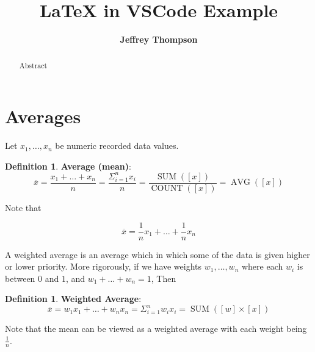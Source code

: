 \documentclass[a4paper]{article}
\theoremstyle{plain} %
\theoremstyle{definition} %
\newtheorem{definition}[theorem]{Definition}
\numberwithin{equation}{subsection}
\begin{document}

\title{\textbf{LaTeX in VSCode Example}}




\author{\textbf{Jeffrey Thompson}}
\maketitle
\begin{abstract}
Abstract
\end{abstract}
\tableofcontents
\newpage
\section{Averages}
Let $x_1,\dots, x_n$ be numeric recorded data values.

\begin{definition}
\textbf{Average (mean)}:
$$\overline{x} = \frac{x_1 + \dots + x_n}{n}= \frac{\Sigma_{i=1}^nx_i}{n}= \frac{\operatorname{SUM}([x])}{\operatorname{COUNT}([x])} = \operatorname{AVG}([x])$$
\end{definition}

Note that 

$$\overline{x}= \frac{1}{n}x_1 + \dots + \frac{1}{n}x_n$$

A weighted average is an average which in which some of the data is given higher or lower priority. More rigorously, if we have weights $w_1, \dots, w_n$ where each $w_i$ is between $0$ and $1$, and $w_1 + \dots + w_n = 1$, Then

\begin{definition}
\textbf{Weighted Average}:
$$\overline{x} = w_1x_1 + \dots + w_nx_n= \Sigma_{i=1}^nw_ix_i= \operatorname{SUM}([w]\times[x])$$
\end{definition}
Note that the mean can be viewed as a weighted average with each weight being $\frac{1}{n}$. 
\end{document}

